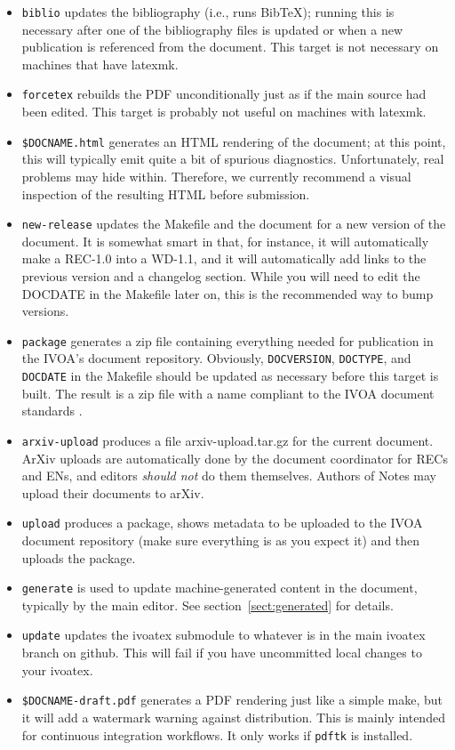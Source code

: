\documentclass[11pt,a4paper]{ivoa}
\newcommand{\BibTeX}{Bib\TeX}
\begin{document}
\begin{itemize}
\item \texttt{biblio} updates the bibliography (i.e., runs \BibTeX);
running this is necessary after one of the bibliography files is updated
or when a new publication is referenced from the document.  This target
is not necessary on machines that have latexmk.
\item \texttt{forcetex} rebuilds the PDF unconditionally just as if the
main source had been edited.  This target is probably not useful on
machines with latexmk.
\item \texttt{\$DOCNAME.html} generates an HTML rendering of the
document; at this point, this will typically emit quite a bit of
spurious diagnostics.  Unfortunately, real problems may hide within.
Therefore, we currently recommend a visual inspection of the resulting
HTML before submission.
\item \texttt{new-release} updates the Makefile and the document for a
new version of the document.  It is somewhat smart in that, for
instance, it will automatically make a REC-1.0 into a WD-1.1, and it
will automatically add links to the previous version and a changelog
section.  While you will need to edit the DOCDATE in the Makefile later on, this
is the recommended way to bump versions.
\item \texttt{package} generates a zip file containing everything needed
for publication in the IVOA's document repository.   Obviously,
\texttt{DOCVERSION}, \texttt{DOCTYPE}, and \texttt{DOCDATE} in the
Makefile should be updated as necessary before this target is built.
The result is a zip file with a name compliant to the IVOA document
standards \citep{2017ivoa.spec.0517G}.
\item \texttt{arxiv-upload}  produces a file arxiv-upload.tar.gz for
the current document.  ArXiv uploads are automatically done by the
document coordinator for RECs and ENs, and editors \emph{should not} do
them themselves.  Authors of Notes may upload their documents to arXiv.
\item \texttt{upload} produces a package, shows metadata to be uploaded to the
IVOA document repository (make sure everything is as you expect it) and
then uploads the package.
\item \texttt{generate} is used to update machine-generated content in
the document, typically by the main editor.  See
section~\ref{sect:generated} for details.
\item \texttt{update} updates the ivoatex submodule to whatever is in
the main ivoatex branch on github.  This will fail if you have
uncommitted local changes to your ivoatex.
\item \texttt{\$DOCNAME-draft.pdf} generates a PDF rendering just like a
simple make, but it will add a watermark warning against distribution.  This is
mainly intended for continuous integration workflows.  It only works
if \verb|pdftk| is installed.
\end{itemize}
\end{document}
